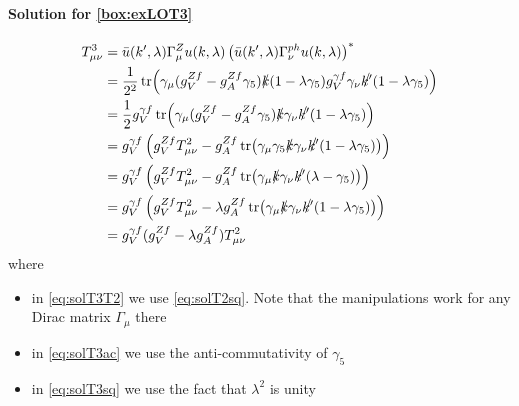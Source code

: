 \paragraph{Solution for \cref{box:exLOT3}}
\begin{align}
    T^3_{\mu\nu} &= \bar u(k',\lambda)\Gamma^Z_\mu u(k,\lambda) \left(\bar u(k',\lambda)\Gamma^{ph}_\nu u(k,\lambda)\right)^*\\
        &=\frac 1 {2^2} \tr(\gamma_\mu(g_V^{Z f}- g_A^{Z f}\gamma_5) \slashed{k}(1-\lambda \gamma_5) g_V^{\gamma f}\gamma_\nu \slashed{k'} (1-\lambda \gamma_5))\\
        &=\frac 1 {2} g_V^{\gamma f}\tr(\gamma_\mu(g_V^{Z f}- g_A^{Z f}\gamma_5) \slashed{k} \gamma_\nu \slashed{k'} (1-\lambda \gamma_5)) \label{eq:solT3T2}\\
        &= g_V^{\gamma f}\left(g_V^{Z f}T^2_{\mu\nu} - g_A^{Z f}\tr(\gamma_\mu\gamma_5\slashed{k}\gamma_\nu \slashed{k'} (1-\lambda \gamma_5))\right)\\
        &= g_V^{\gamma f}\left(g_V^{Z f}T^2_{\mu\nu} - g_A^{Z f}\tr(\gamma_\mu\slashed{k}\gamma_\nu \slashed{k'} (\lambda - \gamma_5))\right) \label{eq:solT3ac}\\
        &= g_V^{\gamma f}\left(g_V^{Z f}T^2_{\mu\nu} - \lambda g_A^{Z f}\tr(\gamma_\mu\slashed{k}\gamma_\nu \slashed{k'} (1-\lambda\gamma_5))\right) \label{eq:solT3sq}\\
        &= g_V^{\gamma f}(g_V^{Z f} - \lambda g_A^{Z f})T^2_{\mu\nu}
\end{align}
where
\begin{itemize}
    \item in \cref{eq:solT3T2} we use \cref{eq:solT2sq}. Note that the manipulations work for any Dirac matrix $\Gamma_\mu$ there
    \item in \cref{eq:solT3ac} we use the anti-commutativity of $\gamma_5$
    \item in \cref{eq:solT3sq} we use the fact that $\lambda^2$ is unity
\end{itemize}

